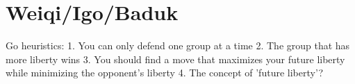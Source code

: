 \chapter{Weiqi/Igo/Baduk}

Go heuristics:
1. You can only defend one group at a time
2. The group that has more liberty wins
3. You should find a move that maximizes your future liberty while minimizing the opponent's liberty
4. The concept of 'future liberty'?
